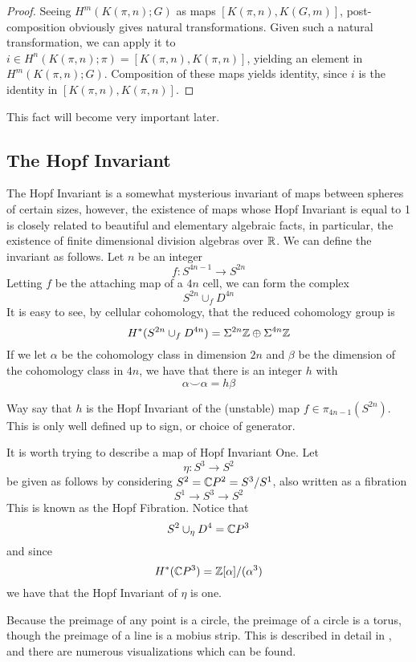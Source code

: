 \begin{proof}
  Seeing $H^m(K(\pi,n);G)$ as maps $[K(\pi,n),K(G,m)]$, post-composition obviously gives natural transformations.  Given such a natural transformation, we can apply it to $i\in H^n(K(\pi,n);\pi)=[K(\pi,n),K(\pi,n)]$, yielding an element in $H^m(K(\pi,n);G)$.  Composition of these maps yields identity, since $i$ is the identity in $[K(\pi,n),K(\pi,n)]$.  
\end{proof}

This fact will become very important later.  

\subsection{The Hopf Invariant}

\label{sec:HopfInvariant}

The Hopf Invariant is a somewhat mysterious invariant of maps between spheres of certain sizes, however, the existence of maps whose Hopf Invariant is equal to 1 is closely related to beautiful and elementary algebraic facts, in particular, the existence of finite dimensional division algebras over $\mathbb{R}$.  
We can define the invariant as follows.  
Let $n$ be an integer
\[f:S^{4n-1}\to S^{2n}\]
Letting $f$ be the attaching map of a $4n$ cell, we can form the complex
\[S^{2n}\cup_f D^{4n}\]
It is easy to see, by cellular cohomology, that the reduced cohomology group is
\[H^*(S^{2n}\cup_f D^{4n})=\Sigma^{2n}\mathbb{Z}\oplus \Sigma^{4n}\mathbb{Z}\]
If we let $\alpha$ be the cohomology class in dimension $2n$ and $\beta$ be the dimension of the cohomology class in $4n$, we have that there is an integer $h$ with
\[\alpha\smile\alpha=h\beta\]
\begin{Def}
  Way say that $h$ is the Hopf Invariant of the (unstable) map $f\in \pi_{4n-1}(S^{2n})$.  This is only well defined up to sign, or choice of generator.  
\end{Def}

It is worth trying to describe a map of Hopf Invariant One.
Let
\[\eta : S^3\to S^2\]
be given as follows by considering $S^2=\mathbb{C} P^2=S^3/S^1$, also written as a fibration
\[S^1\to S^3\to S^2\]
This is known as the Hopf Fibration.  
Notice that 
\[S^2\cup_\eta D^4=\mathbb{C} P^3\]
 and since 
\[H^*(\mathbb{C} P^3) = \mathbb{Z}[\alpha]/(\alpha^3)\]
we have that the Hopf Invariant of $\eta$ is one.  

Because the preimage of any point is a circle, the preimage of a circle is a torus, though the preimage of a line is a mobius strip.  This is described in detail in \cite[Example~4.45]{HatcherAT}, and there are numerous visualizations which can be found.  

